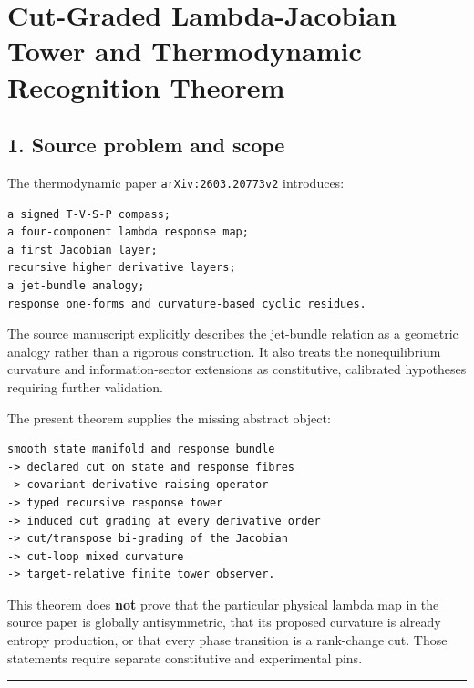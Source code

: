 \hypertarget{cut-graded-lambda-jacobian-tower-and-thermodynamic-recognition-theorem}{%
\chapter{Cut-Graded Lambda-Jacobian Tower and Thermodynamic Recognition Theorem}\label{cut-graded-lambda-jacobian-tower-and-thermodynamic-recognition-theorem}}

\hypertarget{source-problem-and-scope}{%
\section{1. Source problem and scope}\label{source-problem-and-scope}}

The thermodynamic paper \texttt{arXiv:2603.20773v2} introduces:

\begin{verbatim}
a signed T-V-S-P compass;
a four-component lambda response map;
a first Jacobian layer;
recursive higher derivative layers;
a jet-bundle analogy;
response one-forms and curvature-based cyclic residues.
\end{verbatim}

The source manuscript explicitly describes the jet-bundle relation as a
geometric analogy rather than a rigorous construction. It also treats the
nonequilibrium curvature and information-sector extensions as constitutive,
calibrated hypotheses requiring further validation.

The present theorem supplies the missing abstract object:

\begin{verbatim}
smooth state manifold and response bundle
-> declared cut on state and response fibres
-> covariant derivative raising operator
-> typed recursive response tower
-> induced cut grading at every derivative order
-> cut/transpose bi-grading of the Jacobian
-> cut-loop mixed curvature
-> target-relative finite tower observer.
\end{verbatim}

This theorem does \textbf{not} prove that the particular physical lambda map in the
source paper is globally antisymmetric, that its proposed curvature is already
entropy production, or that every phase transition is a rank-change cut.
Those statements require separate constitutive and experimental pins.

\begin{center}\rule{0.5\linewidth}{0.5pt}\end{center}

